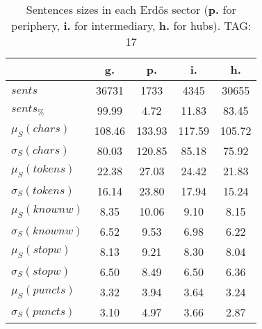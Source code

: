 \begin{table}[h!]
\begin{center}
\begin{tabular}{| l || c | c | c | c |}\hline
 & {\bf g.} & {\bf p.} & {\bf i.} & {\bf h.} \\\hline\hline
$sents$ & 36731  & 1733  & 4345  & 30655 \\
$sents_{\%}$ & 99.99  & 4.72  & 11.83  & 83.45 \\\hline
$\mu_S(chars)$ & 108.46  & 133.93  & 117.59  & 105.72 \\
$\sigma_S(chars)$ & 80.03  & 120.85  & 85.18  & 75.92 \\\hline
$\mu_S(tokens)$ & 22.38  & 27.03  & 24.42  & 21.83 \\
$\sigma_S(tokens)$ & 16.14  & 23.80  & 17.94  & 15.24 \\\hline
$\mu_S(knownw)$ & 8.35  & 10.06  & 9.10  & 8.15 \\
$\sigma_S(knownw)$ & 6.52  & 9.53  & 6.98  & 6.22 \\\hline
$\mu_S(stopw)$ & 8.13  & 9.21  & 8.30  & 8.04 \\
$\sigma_S(stopw)$ & 6.50  & 8.49  & 6.50  & 6.36 \\\hline
$\mu_S(puncts)$ & 3.32  & 3.94  & 3.64  & 3.24 \\
$\sigma_S(puncts)$ & 3.10  & 4.97  & 3.66  & 2.87 \\\hline
\end{tabular}
\caption{Sentences sizes in each Erd\"os sector ({{\bf p.}} for periphery, {{\bf i.}} for intermediary, {{\bf h.}} for hubs). TAG: 17}
\end{center}
\end{table}
